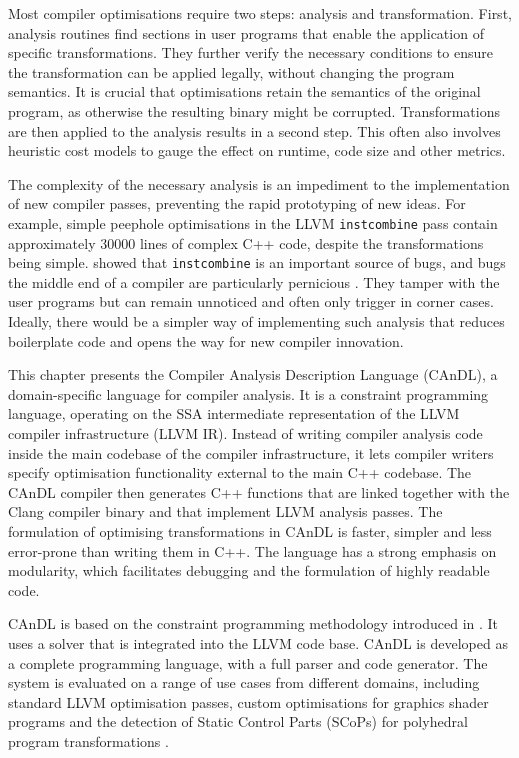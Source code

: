     Most compiler optimisations require two steps:
    analysis and transformation.
    First, analysis routines find sections in user programs that enable the
    application of specific transformations.
    They further verify the necessary conditions to ensure the transformation
    can be applied legally, without changing the program semantics.
    It is crucial that optimisations retain the semantics of the original
    program, as otherwise the resulting binary might be corrupted.
    Transformations are then applied to the analysis results in a second step.
    This often also involves heuristic cost models to gauge the effect on
    runtime, code size and other metrics.

    The complexity of the necessary analysis is an impediment to
    the implementation of new compiler passes, preventing the rapid
    prototyping of new ideas.
    For example, simple peephole optimisations in the LLVM {\tt instcombine}
    pass contain approximately 30000 lines of complex C++ code, despite the
    transformations being simple.
    \citet{Menendez:2017:ADP:3062341.3062372} showed that {\tt instcombine} is
    an important source of bugs, and bugs the middle end of a compiler are
    particularly pernicious \citep{Yang:2011:FUB:1993316.1993532}.
    They tamper with the user programs but can remain unnoticed and often only
    trigger in corner cases.
    Ideally, there would be a simpler way of implementing such analysis that
    reduces boilerplate code and opens the way for new compiler innovation.

    This chapter presents the Compiler Analysis Description Language (CAnDL), a
    domain-specific language for compiler analysis.
    It is a constraint programming language, operating on the SSA intermediate
    representation of the LLVM compiler infrastructure (LLVM IR).
    Instead of writing compiler analysis code inside the main codebase of the
    compiler infrastructure, it lets compiler writers specify optimisation
    functionality external to the main C++ codebase.
    The CAnDL compiler then generates C++ functions that are linked together
    with the Clang compiler binary and that implement LLVM analysis passes.
    The formulation of optimising transformations in CAnDL is faster, simpler
    and less error-prone than writing them in C++.
    The language has a strong emphasis on modularity, which facilitates
    debugging and the formulation of highly readable code.

    CAnDL is based on the constraint programming methodology introduced in
    .
    It uses a solver that is integrated into the LLVM code base.
    CAnDL is developed as a complete programming language, with a full parser
    and code generator.
    The system is evaluated on a range of use cases from
    different domains, including standard LLVM optimisation passes,
    custom optimisations for graphics shader programs and the detection of
    Static Control Parts (SCoPs) \citep{Lengauer2012Polly} for polyhedral
    program transformations \citep{Karp:1967:OCU:321406.321418}.

